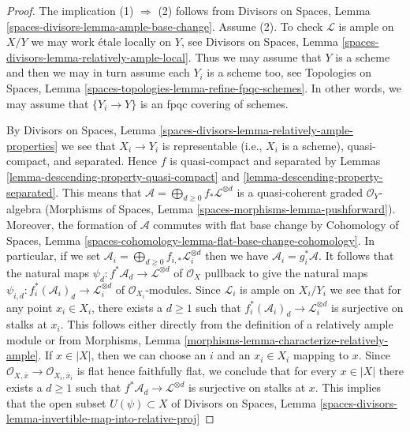 \begin{proof}
The implication (1) $\Rightarrow$ (2) follows from
Divisors on Spaces, Lemma \ref{spaces-divisors-lemma-ample-base-change}.
Assume (2). To check $\mathcal{L}$ is ample on $X/Y$ we may
work \'etale locally on $Y$, see
Divisors on Spaces, Lemma \ref{spaces-divisors-lemma-relatively-ample-local}.
Thus we may assume that $Y$ is a scheme and then we may
in turn assume each $Y_i$ is a scheme too, see
Topologies on Spaces, Lemma \ref{spaces-topologies-lemma-refine-fpqc-schemes}.
In other words, we may assume that
$\{Y_i \to Y\}$ is an fpqc covering of schemes.

\medskip\noindent
By Divisors on Spaces, Lemma
\ref{spaces-divisors-lemma-relatively-ample-properties}
we see that $X_i \to Y_i$ is representable (i.e., $X_i$ is a scheme),
quasi-compact, and separated. Hence $f$ is quasi-compact and separated by
Lemmas \ref{lemma-descending-property-quasi-compact} and
\ref{lemma-descending-property-separated}.
This means that
$\mathcal{A} = \bigoplus_{d \geq 0} f_*\mathcal{L}^{\otimes d}$
is a quasi-coherent graded $\mathcal{O}_Y$-algebra
(Morphisms of Spaces, Lemma \ref{spaces-morphisms-lemma-pushforward}).
Moreover, the formation of $\mathcal{A}$ commutes with flat
base change by
Cohomology of Spaces, Lemma
\ref{spaces-cohomology-lemma-flat-base-change-cohomology}.
In particular, if we set
$\mathcal{A}_i = \bigoplus_{d \geq 0} f_{i, *}\mathcal{L}_i^{\otimes d}$
then we have $\mathcal{A}_i = g_i^*\mathcal{A}$.
It follows that the natural maps
$\psi_d : f^*\mathcal{A}_d \to \mathcal{L}^{\otimes d}$
of $\mathcal{O}_X$
pullback to give the natural maps
$\psi_{i, d} : f_i^*(\mathcal{A}_i)_d \to \mathcal{L}_i^{\otimes d}$
of $\mathcal{O}_{X_i}$-modules. Since $\mathcal{L}_i$ is ample on $X_i/Y_i$
we see that for any point $x_i \in X_i$, there exists a $d \geq 1$
such that $f_i^*(\mathcal{A}_i)_d \to \mathcal{L}_i^{\otimes d}$
is surjective on stalks at $x_i$. This follows either directly
from the definition of a relatively ample module or from
Morphisms, Lemma \ref{morphisms-lemma-characterize-relatively-ample}.
If $x \in |X|$, then we can choose an $i$ and an $x_i \in X_i$
mapping to $x$. Since
$\mathcal{O}_{X, \overline{x}} \to \mathcal{O}_{X_i, \overline{x}_i}$
is flat hence faithfully flat, we conclude that for every $x \in |X|$
there exists a $d \geq 1$ such that
$f^*\mathcal{A}_d \to \mathcal{L}^{\otimes d}$
is surjective on stalks at $x$.
This implies that the open subset $U(\psi) \subset X$ of
Divisors on Spaces, Lemma
\ref{spaces-divisors-lemma-invertible-map-into-relative-proj}

\end{proof}
